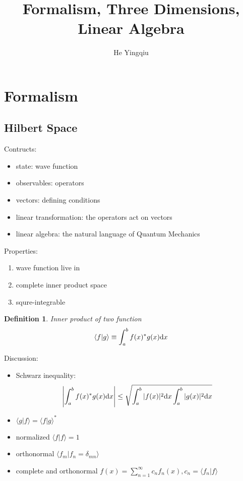 \documentclass[a4paper,12pt]{article}
\title{Formalism, Three Dimensions, Linear Algebra}
\author{He Yingqiu}
\newtheorem{dfn}[thm]{Definition}
\begin{document}
\maketitle
\tableofcontents
\newpage

\section{Formalism}
\subsection{Hilbert Space}
Contructs:
\begin{itemize}
       \item state: wave function
       \item observables: operators
       \item vectors: defining conditions
       \item linear transformation: the operators act on vectors
       \item linear algebra: the natural language of Quantum Mechanics
\end{itemize} 
Properties:
\begin{enumerate}
       \item wave function live in
       \item complete inner product space
       \item squre-integrable
\end{enumerate}
\begin{dfn}
       Inner product of two function 
       \[ 
              \langle f|g \rangle \equiv \int_a^b f(x)^*g(x) {\rm d}x
       \]
\end{dfn}
Discussion:
\begin{itemize}
       \item Schwarz inequality: \[
              \left| \int_a^b f(x)^*g(x) {\rm d}x \right| \leq 
              \sqrt{\int_a^b |f(x)|^2 {\rm d}x\int_a^b |g(x)|^2 {\rm d}x}
              \]
       \item \( \langle g|f \rangle = \langle f|g \rangle^* \)
       \item normalized \( \langle f|f \rangle = 1 \)
       \item orthonormal \( \langle f_m|f_n = \delta_{mn}\rangle \)
       \item complete and orthonormal \( f(x) = \sum_{n=1}^\infty c_nf_n(x),
       c_n=\langle f_n|f \rangle \)
\end{itemize}
\end{document}
